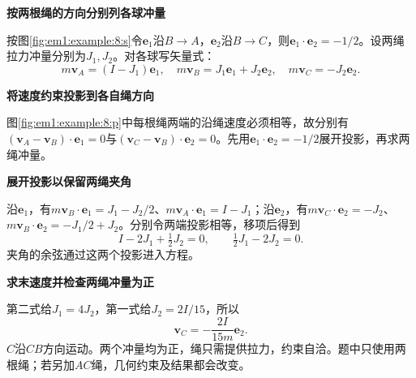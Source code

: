 \begin{solution}\textbf{按两根绳的方向分别列各球冲量}\par\nobreak
按图\ref{fig:em1:example:8:s}令$\bm e_1$沿$B\!\to\!A$，$\bm e_2$沿$B\!\to\!C$，则$\bm e_1\cdot\bm e_2=-1/2$。设两绳拉力冲量分别为$J_1,J_2$。对各球写矢量式：
\[m\bm v_A=(I-J_1)\bm e_1,\quad m\bm v_B=J_1\bm e_1+J_2\bm e_2,\quad m\bm v_C=-J_2\bm e_2.\]



\par\medskip{}\noindent\textbf{将速度约束投影到各自绳方向}\par\nobreak
图\ref{fig:em1:example:8:p}中每根绳两端的沿绳速度必须相等，故分别有$(\bm v_A-\bm v_B)\cdot\bm e_1=0$与$(\bm v_C-\bm v_B)\cdot\bm e_2=0$。先用$\bm e_1\cdot\bm e_2=-1/2$展开投影，再求两绳冲量。


\par\medskip{}\noindent\textbf{展开投影以保留两绳夹角}\par\nobreak
沿$\bm e_1$，有$m\bm v_B\cdot\bm e_1=J_1-J_2/2$、$m\bm v_A\cdot\bm e_1=I-J_1$；沿$\bm e_2$，有$m\bm v_C\cdot\bm e_2=-J_2$、$m\bm v_B\cdot\bm e_2=-J_1/2+J_2$。分别令两端投影相等，移项后得到
\[
I-2J_1+\tfrac12J_2=0,\qquad \tfrac12J_1-2J_2=0.
\]
夹角的余弦通过这两个投影进入方程。



\par\medskip{}\noindent\textbf{求末速度并检查两绳冲量为正}\par\nobreak
第二式给$J_1=4J_2$，第一式给$J_2=2I/15$，所以
\[\boxed{\bm v_C=-\frac{2I}{15m}\bm e_2}.\]
$C$沿$CB$方向运动。两个冲量均为正，绳只需提供拉力，约束自洽。题中只使用两根绳；若另加$AC$绳，几何约束及结果都会改变。\end{solution}
